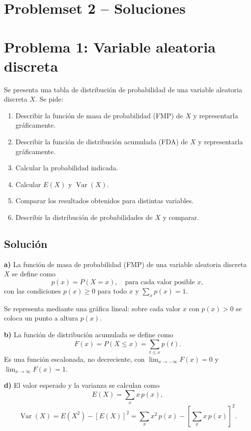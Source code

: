 \documentclass[12pt]{article}
\begin{document}
\section*{Problemset 2 -- Soluciones}

\section{Problema 1: Variable aleatoria discreta}

Se presenta una tabla de distribución de probabilidad de una variable aleatoria discreta $X$. Se pide:

\begin{enumerate}[label=\alph*)]
    \item Describir la función de masa de probabilidad (FMP) de $X$ y representarla gráficamente.
    \item Describir la función de distribución acumulada (FDA) de $X$ y representarla gráficamente.
    \item Calcular la probabilidad indicada.
    \item Calcular $E(X)$ y $\operatorname{Var}(X)$.
    \item Comparar los resultados obtenidos para distintas variables.
    \item Describir la distribución de probabilidades de $X$ y comparar.
\end{enumerate}

\subsection{Solución}

\textbf{a)} La función de masa de probabilidad (FMP) de una variable aleatoria discreta $X$ se define como
$$p(x) = P(X = x), \quad \text{para cada valor posible } x,$$
con las condiciones $p(x)\geq 0$ para todo $x$ y $\displaystyle\sum_x p(x) = 1$.

Se representa mediante una gráfica lineal: sobre cada valor $x$ con $p(x)>0$ se coloca un punto a altura $p(x)$.

\textbf{b)} La función de distribución acumulada se define como
$$F(x) = P(X \leq x) = \sum_{t \leq x} p(t).$$
Es una función escalonada, no decreciente, con $\lim_{x\to -\infty}F(x)=0$ y $\lim_{x\to\infty}F(x)=1$.

\textbf{d)} El valor esperado y la varianza se calculan como
$$E(X) = \sum_x x\, p(x),$$
$$\operatorname{Var}(X) = E(X^2) - [E(X)]^2 = \sum_x x^2\, p(x) - \left[\sum_x x\, p(x)\right]^2.$$
\end{document}
